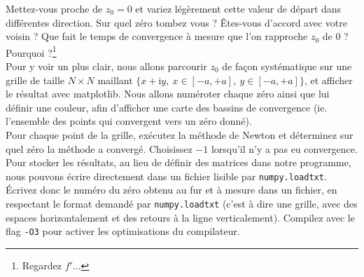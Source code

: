 \documentclass{book}
\begin{document}
Mettez-vous proche de $z_0=0$ et variez légèrement cette valeur de départ dans différentes direction. Sur quel zéro tombez vous ? Êtes-vous d'accord avec votre voisin ? Que fait le temps de convergence à mesure que l'on rapproche $z_0$ de $0$ ? Pourquoi ?\footnote{Regardez $f'$...}\\

Pour y voir un plus clair, nous allons parcourir $z_0$ de façon systématique sur une grille de taille $N\times N$ maillant $\{x+\mathrm{i}y,\ x\in[-a,+a],\ y\in[-a,+a]\}$, et afficher le résultat avec matplotlib. Nous allons numéroter chaque zéro ainsi que lui définir une couleur, afin d'afficher une carte des bassins de convergence (ie. l'ensemble des points qui convergent vers un zéro donné).\\

Pour chaque point de la grille, exécutez la méthode de Newton et déterminez sur quel zéro la méthode a convergé. Choisissez $-1$ lorsqu'il n'y a pas eu convergence. Pour stocker les résultats, au lieu de définir des matrices dans notre programme, nous pouvons écrire directement dans un fichier lisible par \texttt{numpy.loadtxt}. Écrivez donc le numéro du zéro obtenu au fur et à mesure dans un fichier, en respectant le format demandé par \texttt{numpy.loadtxt} (c'est à dire une grille, avec des espaces horizontalement et des retours à la ligne verticalement). Compilez avec le flag \texttt{-O3} pour activer les optimisations du compilateur.\\
\end{document}
